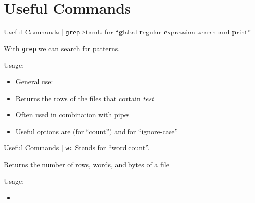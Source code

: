 \documentclass{setbeamer}
\begin{document}
\section{Useful Commands}

\begin{frame}{Useful Commands | \texttt{grep}}
    Stands for ``\textbf{g}lobal \textbf{r}egular \textbf{e}xpression search and \textbf{p}rint''.

    \vspace{0.3cm}

    With \texttt{grep} we can search for patterns.
    \vspace{0.3cm}


    Usage:
    \begin{itemize}
        \item General use: 
        \item {}\textemdash Returns the rows of the  files that contain \emph{test}
        \item {}\textemdash Often used in combination with pipes 
        \item Useful options are  (for ``count'') and  {for ``ignore-case''}
    \end{itemize}

\end{frame}

\begin{frame}{Useful Commands | \texttt{wc}}
    Stands for ``word count''.

    \vspace{0.3cm}
    
    Returns the number of rows, words, and bytes of a file.

    \vspace{0.3cm}

    Usage:
    \begin{itemize}
        \item {}
    \end{itemize}
\end{frame}
\end{document}
